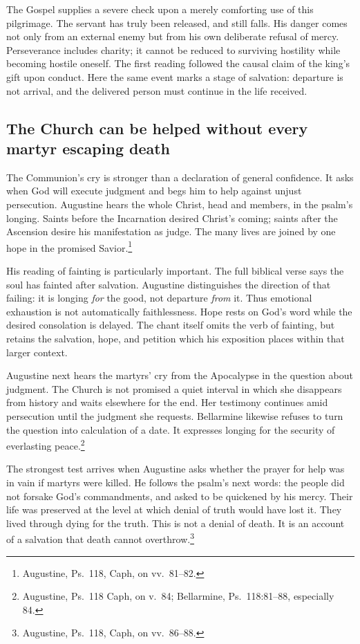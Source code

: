 The Gospel supplies a severe check upon a merely comforting use of
this pilgrimage. The servant has truly been released, and still
falls. His danger comes not only from an external enemy but from his
own deliberate refusal of mercy. Perseverance includes charity; it
cannot be reduced to surviving hostility while becoming hostile
oneself. The first reading followed the causal claim of the king's
gift upon conduct. Here the same event marks a stage of salvation:
departure is not arrival, and the delivered person must continue in
the life received.

\subsection{The Church can be helped without every martyr escaping death}
The Communion's cry is stronger than a declaration of general
confidence. It asks when God will execute judgment and begs him to
help against unjust persecution. Augustine hears the whole Christ,
head and members, in the psalm's longing. Saints before the
Incarnation desired Christ's coming; saints after the Ascension
desire his manifestation as judge. The many lives are joined by
one hope in the promised Savior.\footnote{Augustine, Ps.~118,
Caph, on vv.~81--82.}

His reading of fainting is particularly important. The full biblical
verse says the soul has fainted after salvation. Augustine distinguishes
the direction of that failing: it is longing \emph{for} the good,
not departure \emph{from} it. Thus emotional exhaustion is not
automatically faithlessness. Hope rests on God's word while the
desired consolation is delayed. The chant itself omits the verb
of fainting, but retains the salvation, hope, and petition which
his exposition places within that larger context.

Augustine next hears the martyrs' cry from the Apocalypse in the
question about judgment. The Church is not promised a quiet
interval in which she disappears from history and waits elsewhere
for the end. Her testimony continues amid persecution until the
judgment she requests. Bellarmine likewise refuses to turn the
question into calculation of a date. It expresses longing for
the security of everlasting peace.\footnote{Augustine, Ps.~118
Caph, on v.~84; Bellarmine, Ps.~118:81--88, especially 84.}

The strongest test arrives when Augustine asks whether the prayer
for help was in vain if martyrs were killed. He follows the psalm's
next words: the people did not forsake God's commandments, and
asked to be quickened by his mercy. Their life was preserved at
the level at which denial of truth would have lost it. They lived
through dying for the truth. This is not a denial of death. It is
an account of a salvation that death cannot overthrow.\footnote{Augustine, Ps.~118, Caph, on vv.~86--88.}

